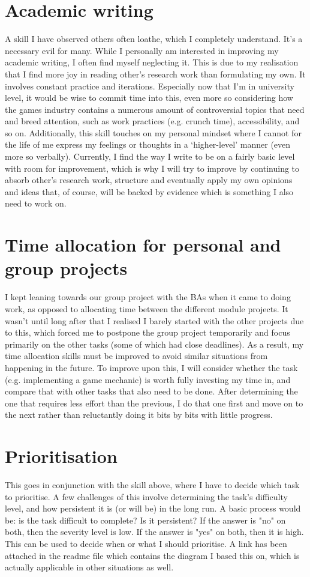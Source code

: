 \documentclass{scrartcl}
\begin{document}
\section{Academic writing}
A skill I have observed others often loathe, which I completely understand. It's a necessary evil for many. While I personally am interested in improving my academic writing, I often find myself neglecting it. This is due to my realisation that I find more joy in reading other's research work than formulating my own. It involves constant practice and iterations. Especially now that I'm in university level, it would be wise to commit time into this, even more so considering how the games industry contains a numerous amount of controversial topics that need and breed attention, such as work practices (e.g. crunch time), accessibility, and so on. Additionally, this skill touches on my personal mindset where I cannot for the life of me express my feelings or thoughts in a `higher-level' manner (even more so verbally). Currently, I find the way I write to be on a fairly basic level with room for improvement, which is why I will try to improve by continuing to absorb other's research work, structure and eventually apply my own opinions and ideas that, of course, will be backed by evidence which is something I also need to work on. 

\section{Time allocation for personal and group projects}
I kept leaning towards our group project with the BAs when it came to doing work, as opposed to allocating time between the different module projects. It wasn't until long after that I realised I barely started with the other projects due to this, which forced me to postpone the group project temporarily and focus primarily on the other tasks (some of which had close deadlines). As a result, my time allocation skills must be improved to avoid similar situations from happening in the future. To improve upon this, I will consider whether the task (e.g. implementing a game mechanic) is worth fully investing my time in, and compare that with other tasks that also need to be done. After determining the one that requires less effort than the previous, I do that one first and move on to the next rather than reluctantly doing it bits by bits with little progress.  

\section{Prioritisation}
This goes in conjunction with the skill above, where I have to decide which task to prioritise. A few challenges of this involve determining the task's difficulty level, and how persistent it is (or will be) in the long run. A basic process would be: is the task difficult to complete? Is it persistent? If the answer is "no" on both, then the severity level is low. If the answer is "yes" on both, then it is high. This can be used to decide when or what I should prioritise. A link has been attached in the readme file which contains the diagram I based this on, which is actually applicable in other situations as well. 
\end{document}
